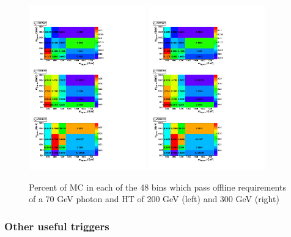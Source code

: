  \begin{figure}[!ht]
  \centering
 \includegraphics[width=0.45\textwidth]{figures/Photon70HT200noPU.pdf}
 \includegraphics[width=0.45\textwidth]{figures/Photon70HT300noPU.pdf}

\caption{Percent of MC in each of the 48 bins which pass offline requirements of a 70 GeV photon
and HT of 200 GeV (left) and 300 GeV (right)}
\label{fig:phohttrigs}
\end{figure}


\subsubsection{Other useful triggers}


